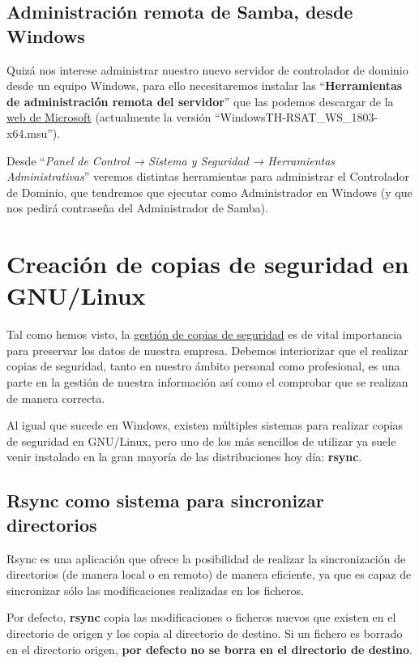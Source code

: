 \section{Administración remota de Samba, desde Windows}
Quizá nos interese administrar nuestro nuevo servidor de controlador de dominio desde un equipo Windows, para ello necesitaremos instalar las “\textbf{Herramientas de administración remota del servidor}” que las podemos descargar de la \href{https://www.microsoft.com/es-es/download/details.aspx?id=45520}{web de Microsoft} (actualmente la versión “WindowsTH-RSAT\_WS\_1803-x64.msu”).

Desde “\textit{Panel de Control → Sistema y Seguridad → Herramientas Administrativas}” veremos distintas herramientas para administrar el Controlador de Dominio, que tendremos que ejecutar como Administrador en Windows (y que nos pedirá contraseña del Administrador de Samba).

\chapter{Creación de copias de seguridad en GNU/Linux}
Tal como hemos visto, la \hyperlink{gestion_copias_de_seguridad}{gestión de copias de seguridad} es de vital importancia para preservar los datos de nuestra empresa. Debemos interiorizar que el realizar copias de seguridad, tanto en nuestro ámbito personal como profesional, es una parte en la gestión de nuestra información así como el comprobar que se realizan de manera correcta.

Al igual que sucede en Windows, existen múltiples sistemas para realizar copias de seguridad en GNU/Linux, pero uno de los más sencillos de utilizar ya suele venir instalado en la gran mayoría de las distribuciones hoy día: \textbf{rsync}.


\section{Rsync como sistema para sincronizar directorios}
Rsync es una aplicación que ofrece la posibilidad de realizar la sincronización de directorios (de manera local o en remoto) de manera eficiente, ya que es capaz de sincronizar sólo las modificaciones realizadas en los ficheros.

Por defecto, \textbf{rsync} copia las modificaciones o ficheros nuevos que existen en el directorio de origen y los copia al directorio de destino. Si un fichero es borrado en el directorio origen,\textbf{ por defecto no se borra en el directorio de destino}.

